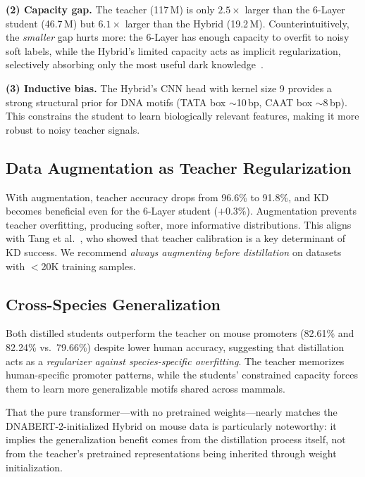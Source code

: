 \documentclass[conference]{IEEEtran}
\begin{document}
\textbf{(2) Capacity gap.}\quad
The teacher (117\,M) is only $2.5\times$ larger than the 6-Layer student (46.7\,M) but $6.1\times$ larger than the Hybrid (19.2\,M). Counterintuitively, the \emph{smaller} gap hurts more: the 6-Layer has enough capacity to overfit to noisy soft labels, while the Hybrid's limited capacity acts as implicit regularization, selectively absorbing only the most useful dark knowledge~\cite{mirzadeh2020improved}.

\textbf{(3) Inductive bias.}\quad
The Hybrid's CNN head with kernel size 9 provides a strong structural prior for DNA motifs (TATA box $\sim$10\,bp, CAAT box $\sim$8\,bp). This constrains the student to learn biologically relevant features, making it more robust to noisy teacher signals.

\subsection{Data Augmentation as Teacher Regularization}

With augmentation, teacher accuracy drops from 96.6\% to 91.8\%, and KD becomes beneficial even for the 6-Layer student ($+0.3\%$). Augmentation prevents teacher overfitting, producing softer, more informative distributions. This aligns with Tang et al.~\cite{tang2020understanding}, who showed that teacher calibration is a key determinant of KD success. We recommend \emph{always augmenting before distillation} on datasets with $<$20K training samples.

\subsection{Cross-Species Generalization}

Both distilled students outperform the teacher on mouse promoters (82.61\% and 82.24\% vs.\ 79.66\%) despite lower human accuracy, suggesting that distillation acts as a \emph{regularizer against species-specific overfitting}. The teacher memorizes human-specific promoter patterns, while the students' constrained capacity forces them to learn more generalizable motifs shared across mammals.

That the pure transformer---with no pretrained weights---nearly matches the DNABERT-2-initialized Hybrid on mouse data is particularly noteworthy: it implies the generalization benefit comes from the distillation process itself, not from the teacher's pretrained representations being inherited through weight initialization.
\end{document}
